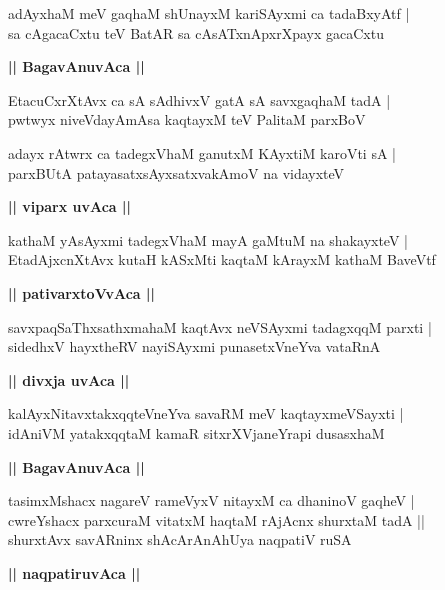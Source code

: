 \documentclass[twoside,12pt,openright]{book}
\newcounter{shloka}[chapter]
\def\uvaca#1{\centerline{{\large\textbf{#1}}}}
\begin{document}
\begin{shloka}%
adAyxhaM meV gaqhaM shUnayxM kariSAyxmi ca tadaBxyAtf |\\
sa cAgacaCxtu teV BatAR sa cAsATxnApxrXpayx gacaCxtu 
\end{shloka}

\uvaca{|| BagavAnuvAca ||}

\begin{shloka}%
EtacuCxrXtAvx ca sA sAdhivxV gatA sA savxgaqhaM tadA |\\
pwtwyx niveVdayAmAsa kaqtayxM teV PalitaM parxBoV 
\end{shloka}

\begin{shloka}%
adayx rAtwrx ca tadegxVhaM ganutxM KAyxtiM karoVti sA |\\
parxBUtA patayasatxsAyxsatxvakAmoV na vidayxteV 
\end{shloka}

\uvaca{|| viparx uvAca ||}

\begin{shloka}%
kathaM yAsAyxmi tadegxVhaM mayA gaMtuM na shakayxteV |\\
EtadAjxcnXtAvx kutaH kASxMti kaqtaM kArayxM kathaM BaveVtf 
\end{shloka}

\uvaca{|| pativarxtoVvAca ||}

\begin{shloka}%
savxpaqSaThxsathxmahaM kaqtAvx neVSAyxmi tadagxqqM parxti |\\
sidedhxV hayxtheRV nayiSAyxmi punasetxVneYva vataRnA 
\end{shloka}

\uvaca{|| divxja uvAca ||}

\begin{shloka}%
kalAyxNitavxtakxqqteVneYva savaRM meV kaqtayxmeVSayxti |\\
idAniVM yatakxqqtaM kamaR sitxrXVjaneYrapi dusasxhaM 
\end{shloka}

\uvaca{|| BagavAnuvAca ||}

\begin{shloka}%
tasimxMshacx nagareV rameVyxV nitayxM ca dhaninoV gaqheV |\\
cwreYshacx parxcuraM vitatxM haqtaM rAjAcnx shurxtaM tadA ||\\
shurxtAvx savARninx shAcArAnAhUya naqpatiV ruSA
\end{shloka}

\uvaca{|| naqpatiruvAca ||}
\end{document}
